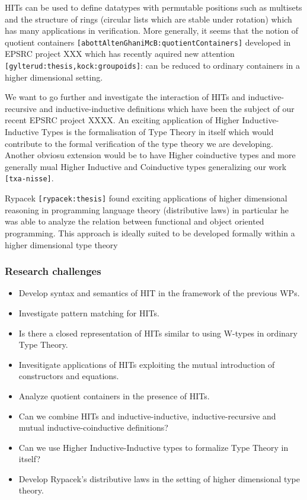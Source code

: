 \documentclass[twocolumn,a4paper,11pt]{article}
\renewcommand{\cite}[1]{{\tt[#1]}}
\begin{document}
HITs can be used to define datatypes with permutable positions such as
multisets and the structure of rings (circular lists which are stable
under rotation) which has many applications in verification. More
generally, it seems that the notion of quotient containers
\cite{abottAltenGhaniMcB:quotientContainers} developed in EPSRC
project XXX which has recently aquired new attention
\cite{gylterud:thesis,kock:groupoids}: can be reduced to ordinary
containers in a higher dimensional setting.

We want to go further and investigate the interaction of HITs and
inductive-recursive and inductive-inductive definitions which have
been the subject of our recent EPSRC project XXXX. An exciting
application of Higher Inductive-Inductive Types is the formalisation
of Type Theory in itself which would contribute to the formal
verification of the type theory we are developing. Another obviosu
extension would be to have Higher coinductive types and more generally
mual Higher Inductive and Coinductive types generalizing our work
\cite{txa-nisse}. 

Rypacek \cite{rypacek:thesis} found exciting applications of higher
dimensional reasoning in programming language theory (distributive
laws) in particular he was able to analyze the relation between
functional and object oriented programming. This approach is ideally
suited to be developed formally within a higher dimensional type theory

\subsubsection*{Research challenges}

\begin{itemize}

\item Develop syntax and semantics of HIT in the framework of the
  previous WPs.

\item Investigate pattern matching for HITs.

\item Is there a closed representation of HITs similar to using
  W-types in ordinary Type Theory.

\item Invesitigate applications of HITs exploiting the mutual
  introduction of constructors and equations.

\item Analyze quotient containers in the presence of HITs.

\item Can we combine HITs and inductive-inductive, inductive-recursive 
  and mutual inductive-coinductive definitions?

\item Can we use Higher Inductive-Inductive types to formalize
  Type Theory in itself?

\item Develop Rypacek's distributive laws in the setting of higher
  dimensional type theory.
\end{itemize}
\end{document}
